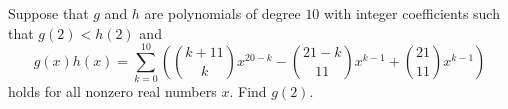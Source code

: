 Suppose that $g$ and $h$ are polynomials of degree $10$ with integer coefficients such that $g(2) < h(2)$ and
\[ g(x) h(x)
	= \sum_{k=0}^{10} \left( \binom{k+11}{k} x^{20-k} - \binom{21-k}{11} x^{k-1} + \binom{21}{11}x^{k-1} \right) \]
holds for all nonzero real numbers $x$. Find $g(2)$.
